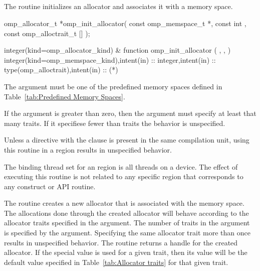 \subsection{}
\label{subsec:omp_init_allocator}

\summary
The  routine initializes an allocator and 
associates it with a memory space.

\format
\begin{ccppspecific}
\begin{ompcFunction}
omp_allocator_t *omp_init_allocator(
  const omp_memspace_t *,
  const int ,
  const omp_alloctrait_t []
);
\end{ompcFunction}
\end{ccppspecific}
\begin{fortranspecific}
\begin{ompfFunction}
integer(kind=omp_allocator_kind) &
function omp_init_allocator ( , ,  )
integer(kind=omp_memspace_kind),intent(in) :: 
integer,intent(in) :: 
type(omp_alloctrait),intent(in) :: (*)
\end{ompfFunction}
\end{fortranspecific}

\constraints
The  argument must be one of the predefined memory 
spaces defined in Table~\ref{tab:Predefined Memory Spaces}.

If the  argument is greater than zero, then the  
argument must specify at least that many traits. If it specifiese fewer 
than  traits the behavior is unspecified.

Unless a  directive with the  
clause is present in the same compilation unit, using this routine in 
a  region results in unspecified behavior.

\binding
The binding thread set for an  region is all 
threads on a device. The effect of executing this routine is not related 
to any specific region that corresponds to any construct or API routine.

\effect
The  routine creates a new allocator that is 
associated with the  memory space. The allocations done 
through the created allocator will behave according to the allocator 
traits specified in the  argument.  The number of traits 
in the  argument is specified by the  argument. 
Specifying the same allocator trait more than once results in unspecified 
behavior. The routine returns a handle for the created allocator. If 
the special  value is used for a given trait, 
then its value will be the default value specified in 
Table~\ref{tab:Allocator traits} for that given trait.

